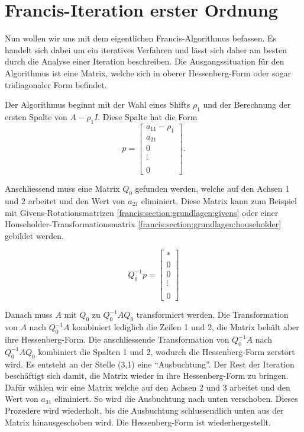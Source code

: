 \section{Francis-Iteration erster Ordnung\label{francis:section:francis_iteration}}

Nun wollen wir uns mit dem eigentlichen Francis-Algorithmus \cite{francis:watkins_book} befassen.
Es handelt sich dabei um ein iteratives Verfahren und lässt sich daher am besten durch die Analyse einer Iteration beschreiben.
Die Ausgangssituation für den Algorithmus ist eine Matrix, welche sich in oberer Hessenberg-Form oder sogar tridiagonaler Form befindet.

Der Algorithmus beginnt mit der Wahl eines Shifts $\rho_{1}$ und der Berechnung der ersten Spalte von $A-\rho_{1} I$. 
%
Diese Spalte hat die Form
\begin{equation}
	p=\begin{bmatrix}
	a_{11}-\rho_{1}\\
	a_{21}\\
	0\\
	\vdots\\
	\\
	0
	\end{bmatrix}.
\end{equation}

Anschliessend muss eine Matrix $Q_{0}$ gefunden werden, welche auf den Achsen 1 und 2 arbeitet und den Wert von $a_{21}$ eliminiert. Diese Matrix kann zum Beispiel mit Givens-Rotationsmatrizen \ref{francis:section:grundlagen:givens} oder einer Householder-Transformationsmatrix \ref{francis:section:grundlagen:householder} gebildet werden.

\begin{equation}
	Q_{0}^{-1}p=\begin{bmatrix}
	*\\
	0\\
	0\\
	\vdots\\
	\\
	0
	\end{bmatrix}
\end{equation}

Danach muss $A$ mit $Q_{0}$ zu  $Q_{0}^{-1}AQ_{0}$ transformiert werden.
Die Transformation von $A$ nach $Q_{0}^{-1}A$ kombiniert lediglich die Zeilen 1 und 2, die Matrix behält aber ihre Hessenberg-Form.
Die anschliessende Transformation von $Q_{0}^{-1}A$ nach $Q_{0}^{-1}AQ_{0}$ kombiniert die Spalten 1 und 2, wodurch die Hessenberg-Form zerstört wird.
Es entsteht an der Stelle (3,1) eine ``Ausbuchtung''.
%
Der Rest der Iteration beschäftigt sich damit, die Matrix wieder in ihre Hessenberg-Form zu bringen.
Dafür wählen wir eine Matrix welche auf den Achsen 2 und 3 arbeitet und den Wert von $a_{31}$ eliminiert.
So wird die Ausbuchtung nach unten verschoben.
Dieses Prozedere wird wiederholt, bis die Ausbuchtung schlussendlich unten aus der Matrix hinausgeschoben wird.
Die Hessenberg-Form ist wiederhergestellt.

